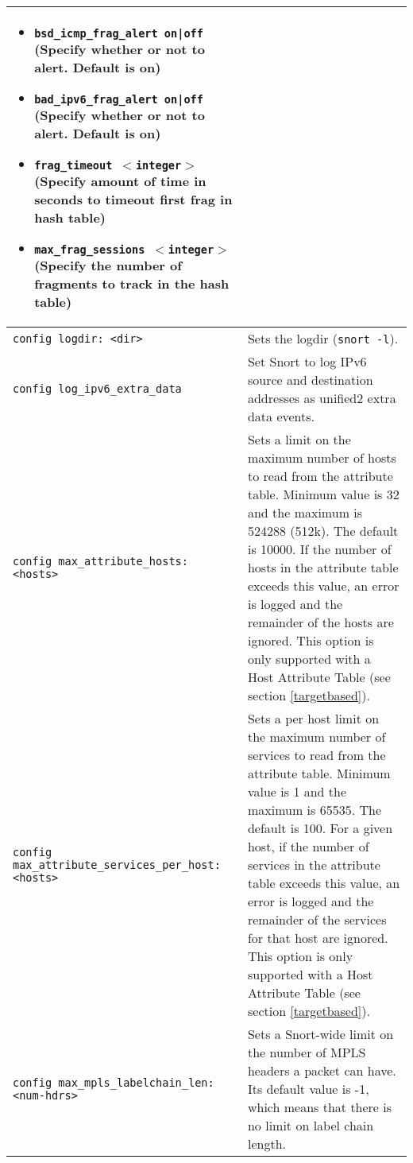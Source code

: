 \documentclass[english]{report}
\begin{document}
\begin{center}
\begin{longtable}[t]{| p{2.5in} | p{3.5in} |}
\begin{itemize}
\item \texttt{bsd\_icmp\_frag\_alert on|off} (Specify whether or not to alert.
Default is on)

\item \texttt{bad\_ipv6\_frag\_alert on|off} (Specify whether or not to alert.
Default is on)

\item \texttt{frag\_timeout $<$integer$>$} (Specify amount of time in seconds
to timeout first frag in hash table)

\item \texttt{max\_frag\_sessions $<$integer$>$} (Specify the number of
fragments to track in the hash table)

\end{itemize} \\

\hline
\texttt{config logdir: <dir>} & Sets the logdir (\texttt{snort -l}).
\\

\hline
\texttt{config log\_ipv6\_extra\_data} & Set Snort to log IPv6 source and destination
addresses as unified2 extra data events.  \\

\hline
\texttt{config max\_attribute\_hosts: <hosts>} & Sets a limit on the maximum
number of hosts to read from the attribute table.  Minimum value is 32 and the
maximum is 524288 (512k).  The default is 10000.  If the number of hosts in the
attribute table exceeds this value, an error is logged and the remainder of the
hosts are ignored.  This option is only supported with a Host Attribute Table
(see section \ref{targetbased}). \\

\hline
\texttt{config max\_attribute\_services\_per\_host: <hosts>} & Sets a per host
limit on the maximum number of services to read from the attribute table. 
Minimum value is 1 and the maximum is 65535.  The default is 100.  For a given
host, if the number of services in the attribute table exceeds this value, an
error is logged and the remainder of the services for that host are ignored. 
This option is only supported with a Host Attribute Table (see section
\ref{targetbased}). \\

\hline
\texttt{config max\_mpls\_labelchain\_len: <num-hdrs>} & Sets a Snort-wide
limit on the number of MPLS headers a packet can have. Its default value is -1,
which means that there is no limit on label chain length.\\


\end{longtable}
\end{center}
\end{document}
